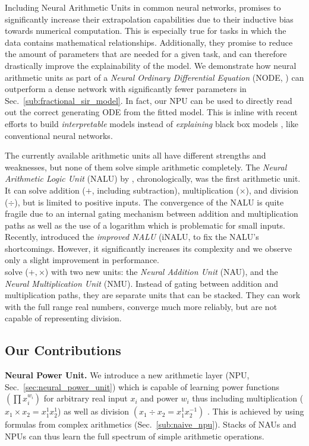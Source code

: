\documentclass[9pt]{article}
\begin{document}
Including Neural Arithmetic Units in common neural networks, promises to
significantly increase their extrapolation capabilities due to their inductive
bias towards numerical computation. This is especially true for tasks in which
the data contains mathematical relationships.  Additionally, they promise to
reduce the amount of parameters that are needed for a given task, and can
therefore drastically improve the explainability of the model.  We demonstrate
how neural arithmetic units as part of a \emph{Neural Ordinary Differential
Equation} (NODE, \cite{chen_neural_2019}) can outperform a dense network with
significantly fewer parameters in Sec.~\ref{sub:fractional_sir_model}.  In
fact, our NPU can be used to directly read out the correct generating ODE from
the fitted model.  This is inline with recent efforts to build
\emph{interpretable} models instead of \emph{explaining} black box models
\citep{rudin_stop_2019}, like conventional neural networks.

The currently available arithmetic units all have different strengths and
weaknesses, but none of them solve simple arithmetic completely.
The \emph{Neural Arithmetic Logic Unit} (NALU) by \cite{trask_neural_2018},
chronologically, was the first arithmetic unit. It can solve
addition ($+$, including subtraction), multiplication ($\times$), and division
($\div$), but is limited to positive inputs. The convergence of the
NALU is quite fragile due to an internal gating mechanism between addition and
multiplication paths as well as the use of a logarithm which is problematic for
small inputs.  Recently, \cite{schlor_inalu_2020} introduced the \emph{improved NALU} (iNALU,
to fix the NALU's shortcomings. However, it significantly increases its complexity and we
observe only a slight improvement in performance.\\
\cite{madsen_neural_2020} solve ($+,\times$) with two new units: the
\emph{Neural Addition Unit} (NAU), and the \emph{Neural Multiplication Unit}
(NMU). Instead of gating between addition and multiplication paths, they are
separate units that can be stacked. They can work with the full range real
numbers, converge much more reliably, but are not capable of representing
division.


\subsection*{Our Contributions}%
\label{sub:our_contribution}

\textbf{Neural Power Unit.}
We introduce a new arithmetic layer (NPU,
Sec.~\ref{sec:neural_power_unit}) which is capable of learning power
functions $(\prod x_{i}^{w_i})$ for arbitrary real input $x_i$ and power $w_i$ thus including multiplication ($x_1\times x_2 = x_1^1 x_2^1$) as well as division $(x_1\div x_2=x_1^{1}x_2^{-1})$ . This is achieved by using formulas from complex arithmetics (Sec.~\ref{sub:naive_npu}).
Stacks of NAUs and NPUs can thus learn the full spectrum of simple arithmetic operations.
\end{document}
